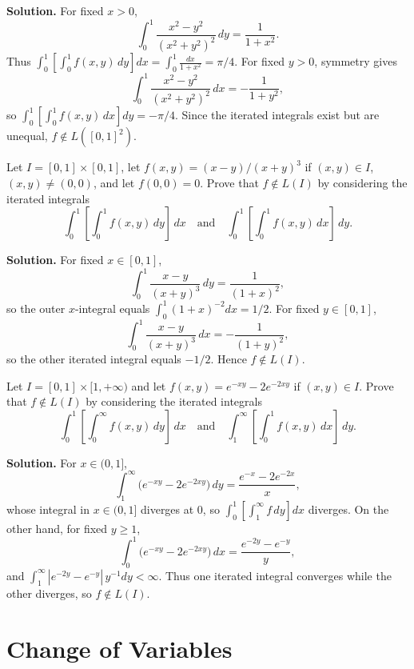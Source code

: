 \noindent\textbf{Solution.}
For fixed \(x>0\),
\[
\int_0^1 \frac{x^2-y^2}{(x^2+y^2)^2}\,dy = \frac{1}{1+x^2}.
\]
Thus \(\int_0^1[\int_0^1 f(x,y)\,dy]dx=\int_0^1\!\frac{dx}{1+x^2}=\pi/4\). For fixed \(y>0\), symmetry gives
\[
\int_0^1 \frac{x^2-y^2}{(x^2+y^2)^2}\,dx = -\frac{1}{1+y^2},
\]
so \(\int_0^1[\int_0^1 f(x,y)\,dx]dy=-\pi/4\). Since the iterated integrals exist but are unequal, \(f\notin L([0,1]^2)\).

\begin{problembox}
Let \( I = [0, 1] \times [0, 1] \), let \( f(x, y) = (x - y)/(x + y)^3 \) if \( (x, y) \in I \), \( (x, y) \neq (0, 0) \), and let \( f(0, 0) = 0 \). Prove that \( f \notin L(I) \) by considering the iterated integrals
\[
\int_0^1 \left[ \int_0^1 f(x, y) \, dy \right] \, dx \quad \text{and} \quad \int_0^1 \left[ \int_0^1 f(x, y) \, dx \right] \, dy.
\]
\end{problembox}

\noindent\textbf{Solution.}
For fixed \(x\in[0,1]\),
\[
\int_0^1 \frac{x-y}{(x+y)^3}\,dy = \frac{1}{(1+x)^{2}},
\]
so the outer \(x\)-integral equals \(\int_0^1 (1+x)^{-2}dx=1/2\). For fixed \(y\in[0,1]\),
\[
\int_0^1 \frac{x-y}{(x+y)^3}\,dx = -\frac{1}{(1+y)^{2}},
\]
so the other iterated integral equals \(-1/2\). Hence \(f\notin L(I)\).

\begin{problembox}
Let \( I = [0, 1] \times [1, +\infty) \) and let \( f(x, y) = e^{-xy} - 2e^{-2xy} \) if \( (x, y) \in I \). Prove that \( f \notin L(I) \) by considering the iterated integrals
\[
\int_0^1 \left[ \int_0^\infty f(x, y) \, dy \right] \, dx \quad \text{and} \quad \int_1^\infty \left[ \int_0^1 f(x, y) \, dx \right] \, dy.
\]
\end{problembox}

\noindent\textbf{Solution.}
For \(x\in(0,1]\),
\[
\int_1^{\infty} \big(e^{-xy}-2e^{-2xy}\big)\,dy = \frac{e^{-x}-2e^{-2x}}{x},
\]
whose integral in \(x\in(0,1]\) diverges at 0, so \(\int_0^1[\int_1^{\infty} f\,dy]dx\) diverges. On the other hand, for fixed \(y\ge 1\),
\[
\int_0^1 \big(e^{-xy}-2e^{-2xy}\big)\,dx = \frac{e^{-2y}-e^{-y}}{y},
\]
and \(\int_1^{\infty} |e^{-2y}-e^{-y}|\,y^{-1} dy<\infty\). Thus one iterated integral converges while the other diverges, so \(f\notin L(I)\).

\section{Change of Variables}

